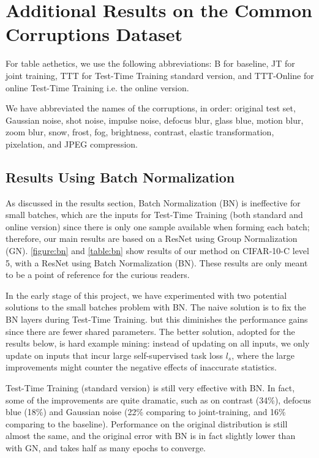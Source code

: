 \documentclass{article}
\theoremstyle{plain}
\theoremstyle{remark}
\theoremstyle{definition}
\begin{document}
\pagebreak

\section{Additional Results on the Common Corruptions Dataset}
\label{results_additional}
For table aethetics, we use the following abbreviations:
B for baseline, JT for joint training, TTT for Test-Time Training standard version, and TTT-Online for online Test-Time Training i.e. the online version.

We have abbreviated the names of the corruptions, in order: original test set, Gaussian noise, shot noise, impulse noise, defocus blur, glass blue, motion blur, zoom blur, snow, frost, fog, brightness, contrast, elastic transformation, pixelation, and JPEG compression. 

\subsection{Results Using Batch Normalization}
As discussed in the results section, Batch Normalization (BN) is ineffective for small batches, which are the inputs for Test-Time Training (both standard and online version) since there is only one sample available when forming each batch; therefore, our main results are based on a ResNet using Group Normalization (GN). 
\autoref{figure:bn} and \autoref{table:bn} show results of our method on CIFAR-10-C level 5, with a ResNet using Batch Normalization (BN). These results are only meant to be a point of reference for the curious readers.

In the early stage of this project, we have experimented with two potential solutions to the small batches problem with BN.  The naive solution is to fix the BN layers during Test-Time Training. but this diminishes the performance gains since there are fewer shared parameters. 
The better solution, adopted for the results below, is hard example mining: instead of updating on all inputs, we only update on inputs that incur large self-supervised task loss $l_s$,
where the large improvements might counter the negative effects of inaccurate statistics.

Test-Time Training (standard version) is still very effective with BN. 
In fact, some of the improvements are quite dramatic, such as on contrast (34\%), defocus blue (18\%) and Gaussian noise (22\% comparing to joint-training, and 16\% comparing to the baseline). Performance on the original distribution is still almost the same, and the original error with BN is in fact slightly lower than with GN, and takes half as many epochs to converge.
\end{document}
